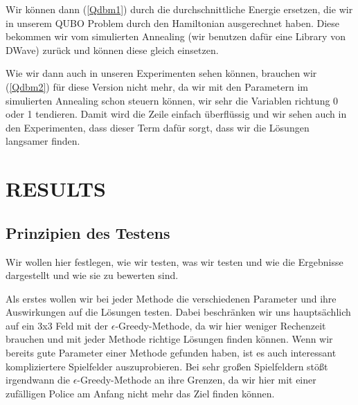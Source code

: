 Wir können dann (\ref{Qdbm1}) durch die durchschnittliche Energie ersetzen, die wir in unserem QUBO Problem durch den Hamiltonian ausgerechnet haben. Diese bekommen wir vom simulierten Annealing (wir benutzen dafür eine Library von DWave) zurück und können diese gleich einsetzen.

Wie wir dann auch in unseren Experimenten sehen können, brauchen wir (\ref{Qdbm2}) für diese Version nicht mehr, da wir mit den Parametern im simulierten Annealing schon steuern können, wir sehr die Variablen richtung 0 oder 1 tendieren. Damit wird die Zeile einfach überflüssig und wir sehen auch in den Experimenten, dass dieser Term dafür sorgt, dass wir die Lösungen langsamer finden.

\section{RESULTS}
\label{sec:res}

\subsection{Prinzipien des Testens}
\label{subsec:Prinzipien}

Wir wollen hier festlegen, wie wir testen, was wir testen und wie die Ergebnisse dargestellt und wie sie zu bewerten sind.

Als erstes wollen wir bei jeder Methode die verschiedenen Parameter und ihre Auswirkungen auf die Lösungen testen. Dabei beschränken wir uns hauptsächlich auf ein 3x3 Feld mit der $\epsilon$-Greedy-Methode, da wir hier weniger Rechenzeit brauchen und mit jeder Methode richtige Lösungen finden können. Wenn wir bereits gute Parameter einer Methode gefunden haben, ist es auch interessant kompliziertere Spielfelder auszuprobieren. Bei sehr großen Spielfeldern stößt irgendwann die $\epsilon$-Greedy-Methode an ihre Grenzen, da wir hier mit einer zufälligen Police am Anfang nicht mehr das Ziel finden können. 

